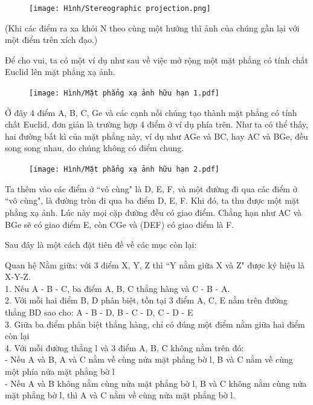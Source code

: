 \begin{multicols}{2}
	\begin{figure}[ht]
		\texttt{[image: Hình/Stereographic projection.png]}
	\end{figure}
	
	(Khi các điểm ra xa khỏi N theo cùng một hướng thì ảnh của chúng gần lại với một điểm trên xích đạo.)
	
	Để cho vui, ta có một ví dụ như sau về việc mở rộng một mặt phẳng có tính chất Euclid lên mặt phẳng xạ ảnh.
	
	\begin{figure}[ht]
		\texttt{[image: Hình/Mặt phẳng xạ ảnh hữu hạn 1.pdf]}
	\end{figure}
	Ở đây 4 điểm A, B, C, Ge và các cạnh nối chúng tạo thành mặt phẳng có tính chất Euclid, đơn giản là trường hợp 4 điểm ở ví dụ phía trên. 
	Như ta có thể thấy, hai đường bất kì của mặt phẳng này, ví dụ như AGe và BC, hay AC và BGe, đều song song nhau, do chúng không có điểm chung. 
	
	\begin{figure}[ht]
		\texttt{[image: Hình/Mặt phẳng xạ ảnh hữu hạn 2.pdf]}
	\end{figure}
	
	Ta thêm vào các điểm ở ``vô cùng" là D, E, F, và một đường đi qua các điểm ở ``vô cùng", là đường tròn đi qua ba điểm D, E, F. Khi đó, ta thu được một mặt phẳng xạ ảnh. Lúc này mọi cặp đường đều có giao điểm. Chẳng hạn như AC và BGe sẽ có giao điểm E, còn CGe và (DEF) có giao điểm là F.
	
	\newpage
	
	Sau đây là một cách đặt tiên đề về các mục còn lại: 
	
	Quan hệ Nằm giữa: với 3 điểm X, Y, Z thì ``Y nằm giữa X và Z" được ký hiệu là X-Y-Z.\\
	1. Nếu A - B - C, ba điểm A, B, C thẳng hàng và C - B - A. \\
	2. Với mỗi hai điểm B, D phân biệt, tồn tại 3 điểm A, C, E nằm trên đường thẳng BD sao cho: A - B - D, B - C - D, C - D - E \\
	3. Giữa ba điểm phân biệt thẳng hàng, chỉ có đúng một điểm nằm giữa hai điểm còn lại \\
	4. Với mỗi đường thẳng l và 3 điểm A, B, C không nằm trên đó: \\
	- Nếu A và B, A và C nằm về cùng nửa mặt phẳng bờ l, B và C nằm về cùng một phía nửa mặt phẳng bờ l \\
	- Nếu A và B không nằm cùng nửa mặt phẳng bờ l, B và C không nằm cùng nửa mặt phẳng bờ l, thì A và C nằm về cùng nửa mặt phẳng bờ l.
	

\end{multicols}
